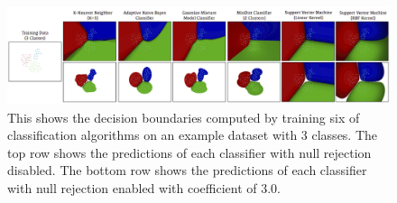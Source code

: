 \begin{figure}
	[h] \hspace{-10 mm} 
	\includegraphics[width=165mm]{figures/content/grt-null.jpg} \caption{This shows the decision boundaries computed by training six of classification algorithms on an example dataset with 3 classes. The top row shows the predictions of each classifier with null rejection disabled. The bottom row shows the predictions of each classifier with null rejection enabled with coefficient of 3.0. \cite{16} } \label{fg:grt:null} 
\end{figure}
